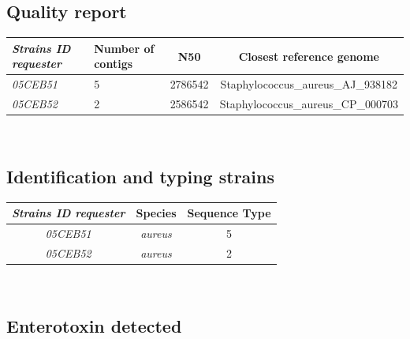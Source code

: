 \documentclass[a4paper]{article}
\begin{document}


\subsection{Quality report \\}

{\renewcommand{\arraystretch}{1} %
{\setlength{\tabcolsep}{1cm} %
\centering
\begin{tabular}{|p{2cm}|p{2cm}|c|c|}
  \hline
  \textbf{\textit{Strains ID requester}} & \textbf{Number of contigs} & \textbf{N50} & \textbf{Closest reference genome} \\
  \hline
  \textit{05CEB51} & 5 & 2786542 & Staphylococcus\_aureus\_AJ\_938182 \\%
  \textit{05CEB52} & 2 & 2586542 & Staphylococcus\_aureus\_CP\_000703 \\%
  \hline 
\end{tabular}\\[1cm]
}}


\subsection{Identification and typing strains \\}


{\renewcommand{\arraystretch}{1} %
{\setlength{\tabcolsep}{1cm} %

\centering
\begin{tabular}{|c|c|c|}
  \hline
  \textbf{\textit{Strains ID requester}} & \textbf{Species} & \textbf{Sequence Type} \\
  \hline
  \textit{05CEB51} & \textit{aureus} & 5 \\%
  \textit{05CEB52} & \textit{aureus} & 2  \\%
  \hline 
\end{tabular}\\[1cm]
}}


\subsection{Enterotoxin detected \\}
\end{document}
